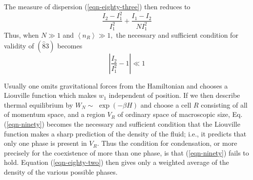 \documentclass[]{article}
\begin{document}
The measure of dispersion (\ref{eqn-eighty-three}) then reduces to
\begin{equation}
\frac{I_{2}-I_{1}^{2}}{I_{1}^{2}}+\frac{I_{1}-I_{2}}{N I_{1}^{2}}
\end{equation}
Thus, when $N \gg 1$ and $\left\langle n_{R}\right\rangle \gg 1,$ the necessary and sufficient condition for validity of $(\hat{8} 3)$ becomes
\begin{equation}
\left|\frac{I_{2}}{I_{1}^{2}}-1\right| \ll 1 \label{eqn-ninety}
\end{equation}

Usually one omits gravitational forces from the Hamiltonian and chooses a Liouville function which makes $w _{1}$ independent of position. If we then describe thermal equilibrium by $W _{ N } \sim$ $\exp (-\beta H )$ and choose a cell $R$ consisting of all of momentum space, and a region $V_{R}$ of ordinary space of macroscopic size, Eq. (\ref{eqn-ninety}) becomes the necessary and sufficient condition that the Liouville function makes a sharp prediction of the density of the fluid; i.e., it predicts that only one phase is present in $V _{ R }$. Thus the condition for condensation, or more precisely for the coexistence of more than one phase, is that (\ref{eqn-ninety}) fails to hold. Equation (\ref{eqn-eighty-two}) then gives only a weighted average of the density of the various possible phases.
\end{document}
